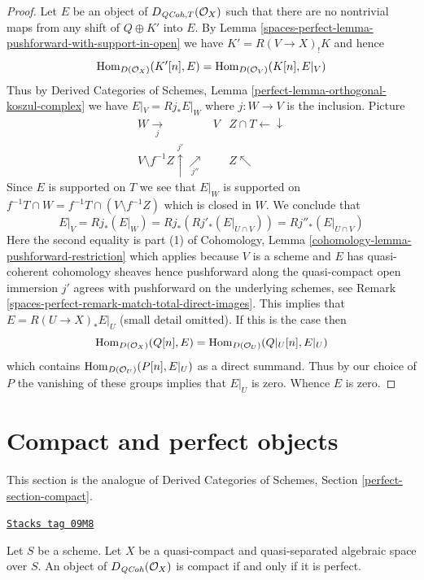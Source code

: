 \begin{proof}
\medskip\noindent
Let $E$ be an object of $D_{\mathit{QCoh}, T}(\mathcal{O}_X)$ such that
there are no nontrivial maps from any shift of $Q \oplus K'$ into $E$.
By Lemma \ref{spaces-perfect-lemma-pushforward-with-support-in-open}
we have $K' =  R(V \to X)_! K$ and hence
$$
\operatorname{Hom}_{D(\mathcal{O}_X)}(K'[n], E) = \operatorname{Hom}_{D(\mathcal{O}_V)}(K[n], E|_V)
$$
Thus by
Derived Categories of Schemes,
Lemma \ref{perfect-lemma-orthogonal-koszul-complex} we have
$E|_V = Rj_*E|_W$ where $j : W \to V$ is the inclusion. Picture
$$
\begin{array}{ccc}W \underset{j}{\longrightarrow} & V & Z \cap T \longleftarrow\downarrow \\ V \setminus f^{-1}Z \overset{j'}{\uparrow}\underset{j''}{\nearrow} &  & Z \nwarrow\end{array}
$$
Since $E$ is supported on $T$ we see that $E|_W$ is supported on
$f^{-1}T \cap W = f^{-1}T \cap (V \setminus f^{-1}Z)$
which is closed in $W$. We conclude that
$$
E|_V = Rj_*(E|_W) = Rj_*(Rj'_*(E|_{U \cap V})) = Rj''_*(E|_{U \cap V})
$$
Here the second equality is part (1) of
Cohomology, Lemma \ref{cohomology-lemma-pushforward-restriction}
which applies because $V$ is a scheme and $E$ has quasi-coherent
cohomology sheaves hence pushforward along the quasi-compact
open immersion $j'$ agrees with pushforward on the underlying schemes, see
Remark \ref{spaces-perfect-remark-match-total-direct-images}.
This implies that $E = R(U \to X)_*E|_U$ (small detail omitted). If
this is the case then
$$
\operatorname{Hom}_{D(\mathcal{O}_X)}(Q[n], E) = \operatorname{Hom}_{D(\mathcal{O}_U)}(Q|_U[n], E|_U)
$$
which contains $\operatorname{Hom}_{D(\mathcal{O}_U)}(P[n], E|_U)$ as a direct summand.
Thus by our choice of $P$ the vanishing of these groups implies that $E|_U$
is zero. Whence $E$ is zero.
\end{proof}

\section{Compact and perfect objects}
\label{spaces-perfect-section-compact}
This section is the analogue of
Derived Categories of Schemes, Section \ref{perfect-section-compact}.

\begin{proposition}
\label{spaces-perfect-proposition-compact-is-perfect}
\href{https://stacks.math.columbia.edu/tag/09M8}{\texttt{Stacks tag 09M8}}

Let $S$ be a scheme.
Let $X$ be a quasi-compact and quasi-separated algebraic space over $S$.
An object of $D_{\mathit{QCoh}}(\mathcal{O}_X)$ is compact
if and only if it is perfect.
\end{proposition}

